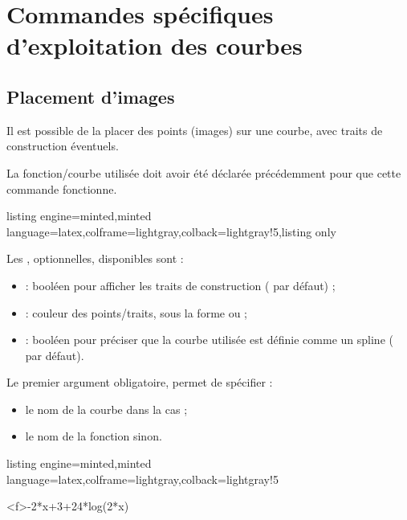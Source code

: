 \documentclass[11pt,a4paper]{ltxdoc}
\begin{document}
\pagebreak

\section{Commandes spécifiques d'exploitation des courbes}

\subsection{Placement d'images}\label{images}

Il est possible de la placer des points (images) sur une courbe, avec traits de construction éventuels.

La fonction/courbe utilisée doit avoir été déclarée précédemment pour que cette commande fonctionne.

\begin{tcblisting}{listing engine=minted,minted language=latex,colframe=lightgray,colback=lightgray!5,listing only}
\end{tcblisting}

Les \MontreCode{[clés]}, optionnelles, disponibles sont :

\smallskip

\begin{itemize}
	\item {} : booléen pour afficher les traits de construction ( par défaut) ;
	\item {} : couleur des points/traits, sous la forme  ou  ;
	\item {} : booléen pour préciser que la courbe utilisée est définie comme un \textsf{spline} ( par défaut).
\end{itemize}

\smallskip

Le premier argument obligatoire, permet de spécifier :

\smallskip

\begin{itemize}
	\item le nom de la courbe dans la cas  ;
	\item le nom de la fonction sinon.
\end{itemize}

\begin{tcblisting}{listing engine=minted,minted language=latex,colframe=lightgray,colback=lightgray!5}
\begin{GraphiqueTikz}%
	[x=0.9cm,y=0.425cm,Xmin=4,Xmax=20,Origx=4,
	Ymin=40,Ymax=56,Ygrille=2,Ygrilles=1,Origy=40]
	{-2*x+3+24*log(2*x)}
\end{GraphiqueTikz}
\end{tcblisting}
\end{document}
